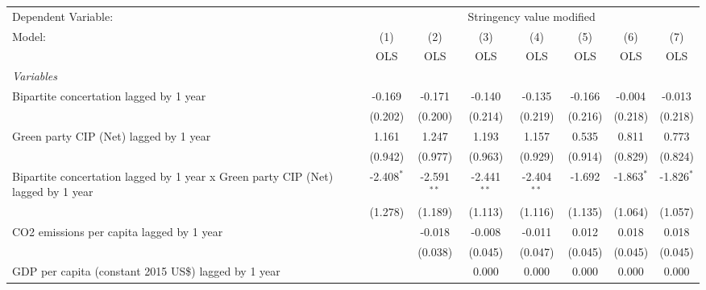 
\begingroup
\centering
\begin{tabular}{lccccccc}
   \toprule
   Dependent Variable: & \multicolumn{7}{c}{Stringency value modified}\\
   Model:                                                                           & (1)          & (2)           & (3)           & (4)           & (5)          & (6)          & (7)\\  
                                                                                    &  OLS         & OLS           & OLS           & OLS           & OLS          & OLS          & OLS\\  
   \midrule
   \emph{Variables}\\
   Bipartite concertation lagged by 1 year                                          & -0.169       & -0.171        & -0.140        & -0.135        & -0.166       & -0.004       & -0.013\\   
                                                                                    & (0.202)      & (0.200)       & (0.214)       & (0.219)       & (0.216)      & (0.218)      & (0.218)\\   
   Green party CIP (Net) lagged by 1 year                                           & 1.161        & 1.247         & 1.193         & 1.157         & 0.535        & 0.811        & 0.773\\   
                                                                                    & (0.942)      & (0.977)       & (0.963)       & (0.929)       & (0.914)      & (0.829)      & (0.824)\\   
   Bipartite concertation lagged by 1 year x Green party CIP (Net) lagged by 1 year & -2.408$^{*}$ & -2.591$^{**}$ & -2.441$^{**}$ & -2.404$^{**}$ & -1.692       & -1.863$^{*}$ & -1.826$^{*}$\\   
                                                                                    & (1.278)      & (1.189)       & (1.113)       & (1.116)       & (1.135)      & (1.064)      & (1.057)\\   
   CO2 emissions per capita lagged by 1 year                                        &              & -0.018        & -0.008        & -0.011        & 0.012        & 0.018        & 0.018\\   
                                                                                    &              & (0.038)       & (0.045)       & (0.047)       & (0.045)      & (0.045)      & (0.045)\\   
   GDP per capita (constant 2015 US\$) lagged by 1 year                             &              &               & 0.000         & 0.000         & 0.000        & 0.000        & 0.000\\   

\end{tabular}
